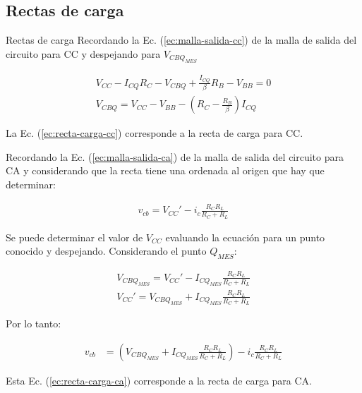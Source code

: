 \subsection{Rectas de carga}
\begin{frame}{Rectas de carga}
    Recordando la Ec. (\ref{ec:malla-salida-cc}) de la malla de salida del circuito para CC
    y despejando para $V_{CBQ_{MES}}$

\begin{gather}
    V_{CC} - I_{CQ}R_C - V_{CBQ} + \frac{I_{CQ}}{\beta}R_B - V_{BB} = 0 \nonumber \\[6pt]
    V_{CBQ} = V_{CC} - V_{BB} - (R_C - \frac{R_B}{\beta})I_{CQ} \label{ec:recta-carga-cc}
\end{gather}

La Ec. (\ref{ec:recta-carga-cc}) corresponde a la recta de carga para CC.

Recordando la Ec. (\ref{ec:malla-salida-ca}) de la malla de salida del circuito para CA y
considerando que la recta tiene una ordenada al origen que hay que determinar:

\begin{gather}
v_{cb} = V_{CC}'-i_c\frac{R_C R_L}{R_C + R_L} \nonumber
\end{gather}

Se puede determinar el valor de $V_{CC}$ evaluando la ecuación para un punto conocido y
despejando. Considerando el punto $Q_{MES}$:

\begin{align*}
V_{CBQ_{MES}} = V_{CC}'-I_{CQ_{MES}}\frac{R_C R_L}{R_C + R_L} \\[6pt]
V_{CC}' = V_{CBQ_{MES}} + I_{CQ_{MES}}\frac{R_C R_L}{R_C + R_L}
\end{align*}

Por lo tanto:

\begin{align}
    v_{cb} &= (V_{CBQ_{MES}} + I_{CQ_{MES}}\frac{R_C R_L}{R_C + R_L})-i_c\frac{R_C R_L}{R_C + R_L} \label{ec:recta-carga-ca}
\end{align}

Esta Ec. (\ref{ec:recta-carga-ca}) corresponde a la recta de carga para CA.


\end{frame}
